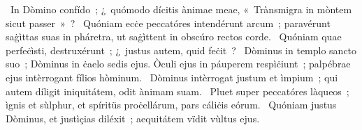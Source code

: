 ~In Dòmino confído~; ¿~quómodo dícitis ànimae meae, «~Trànsmigra in mòntem sicut passer~»~? 
~Quóniam ecċe peccatóres intendérunt arcum~; paravérunt saġìttas suas in pháretra, ut saġìttent in obscúro rectos corde. 
~Quóniam quae perfeċìsti, destruxérunt~; ¿~justus autem, quid feċit~? 
~Dòminus in templo sancto suo~; Dòminus in ċaelo sedis ejus. Òculi ejus in páuperem respìċiunt~; palpébrae ejus intèrrogant fílios hòminum. 
~Dòminus intèrrogat justum et ìmpium~; qui autem díligit iniquitátem, odit ànimam suam. 
~Pluet super peccatóres làqueos~; ìgnis et sùlphur, et spíritüs proċellárum, pars cáliċis eórum. 
~Quóniam justus Dòminus, et justìçias diléxit~; aequitátem vïdit vùltus ejus. 

